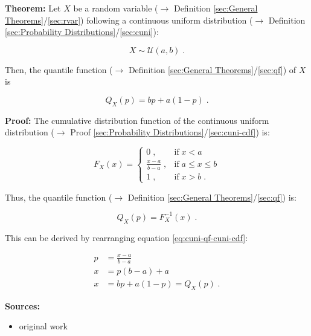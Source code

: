 \documentclass[a4paper,12pt,twoside]{book}
\begin{document}
\textbf{Theorem:} Let $X$ be a random variable ($\rightarrow$ Definition \ref{sec:General Theorems}/\ref{sec:rvar}) following a continuous uniform distribution ($\rightarrow$ Definition \ref{sec:Probability Distributions}/\ref{sec:cuni}):

\begin{equation} \label{eq:cuni-qf-cuni}
X \sim \mathcal{U}(a, b) \; .
\end{equation}

Then, the quantile function ($\rightarrow$ Definition \ref{sec:General Theorems}/\ref{sec:qf}) of $X$ is

\begin{equation} \label{eq:cuni-qf-cuni-qf}
Q_X(p) = bp + a(1-p) \; .
\end{equation}


\vspace{1em}
\textbf{Proof:} The cumulative distribution function of the continuous uniform distribution ($\rightarrow$ Proof \ref{sec:Probability Distributions}/\ref{sec:cuni-cdf}) is:

\begin{equation} \label{eq:cuni-qf-cuni-cdf}
F_X(x) = \left\{
\begin{array}{rl}
0 \; , & \text{if} \; x < a \\
\frac{x-a}{b-a} \; , & \text{if} \; a \leq x \leq b \\
1 \; , & \text{if} \; x > b \; .
\end{array}
\right.
\end{equation}

Thus, the quantile function ($\rightarrow$ Definition \ref{sec:General Theorems}/\ref{sec:qf}) is:

\begin{equation} \label{eq:cuni-qf-cuni-qf-s1}
Q_X(p) = F_X^{-1}(x) \; .
\end{equation}

This can be derived by rearranging equation \eqref{eq:cuni-qf-cuni-cdf}:

\begin{equation} \label{eq:cuni-qf-cuni-cdf-s2}
\begin{split}
p &= \frac{x-a}{b-a} \\
x &= p(b-a) + a \\
x &= bp + a(1-p) = Q_X(p) \; .
\end{split}
\end{equation}


\vspace{1em}
\textbf{Sources:}
\begin{itemize}
\item original work\end{itemize}
\end{document}
